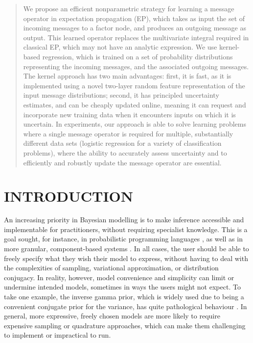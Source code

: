 \documentclass[english]{article}
\theoremstyle{plain}
\theoremstyle{plain}
\begin{document}
\begin{abstract}

We propose an efficient nonparametric strategy for learning a message operator in expectation propagation (EP), which takes as input the set of incoming messages to a factor node, and produces an outgoing message as output. This learned operator replaces the multivariate integral required in classical EP, which may not have an analytic expression. We use kernel-based regression, which is trained on a set of probability distributions representing the incoming messages, and the associated outgoing messages. The kernel approach has two main advantages: first, it is fast, as it is implemented using a novel two-layer random feature representation of the input message distributions; second, it has principled uncertainty estimates, and can be cheaply updated online, meaning it can request and incorporate new training data when it encounters inputs on which it is uncertain.  In experiments, our approach is able to solve learning problems where a single message operator is required for multiple, substantially different data sets (logistic regression for a variety of classification problems), where the ability to accurately assess uncertainty and to efficiently and robustly update the message operator are essential.

\end{abstract}

\section{INTRODUCTION}




An increasing priority in Bayesian modelling is to make inference accessible and implementable for practitioners,
without  requiring specialist knowledge.
This
is a goal sought, for instance, in probabilistic programming languages
\citep{WinGooStuSis11,GooManRoyBonTen08}, 
as well as in more granular, component-based
systems \citep{SDT2014,Minka2014}. In all cases, the user
should be able to freely specify what they wish their model to express,
without having to deal with the complexities of sampling, variational
approximation, or distribution conjugacy.  In reality, however, model convenience and
simplicity can  limit
or undermine intended models, sometimes in ways the users
might not expect. To take one example, the inverse gamma prior, which is
widely used due to being a convenient
conjugate prior for the variance, has quite pathological behaviour \citep{Gelman2006}.
In general, more expressive, freely chosen models are more likely
to require expensive sampling or quadrature approaches, which can make
them challenging to implement or impractical to run.
\end{document}
